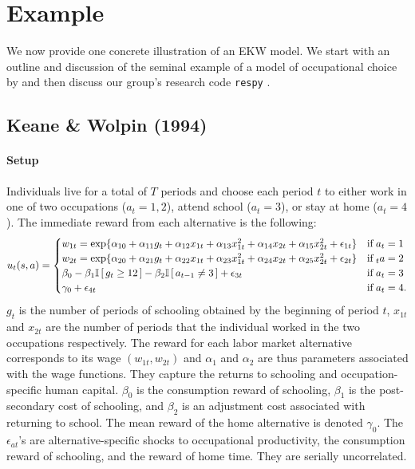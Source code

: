 \section{Example}\label{Example}
We now provide one concrete illustration of an EKW model. We start with an outline and discussion of the seminal example of a model of occupational choice by \citet{Keane.1994} and then discuss our group's research code \verb+respy+ \citep{respy-1.0}.
\subsection{Keane \& Wolpin (1994)}
\paragraph{Setup} Individuals live for a total of $T$ periods and choose each period $t$ to either work in one of two occupations ($a_t = 1, 2$), attend school ($a_t = 3$), or stay at home ($a_t = 4$). The immediate reward from each alternative is the following:
%
\begin{align*}
u_t(s, a) = \begin{cases} w_{1t} =
\exp\{\alpha_{10} + \alpha_{11}g_t + \alpha_{12}x_{1t} + \alpha_{13}x^2_{1t} + \alpha_{14}x_{2t} + \alpha_{15}x^2_{2t} + \epsilon_{1t}\} & \text{if}\; a_t = 1 \\
w_{2t} = \exp\{\alpha_{20} + \alpha_{21}g_t + \alpha_{22}x_{1t} + \alpha_{23}x^2_{1t} + \alpha_{24}x_{2t} + \alpha_{25}x^2_{2t} + \epsilon_{2t}\}& \text{if}\;_t a = 2 \\
\beta_0 - \beta_1 \mathbb{I}\,[\,g_t \geq 12\,] - \beta_2\mathbb{I}\,[\,a_{t - 1} \neq 3\,] + \epsilon_{3t}& \text{if}\; a_t = 3 \\
\gamma_0 + \epsilon_{4t}& \text{if}\; a_t = 4. \\
\end{cases}
\end{align*}
%
$g_t$ is the number of periods of schooling obtained by the beginning of period $t$, $x_{1t}$ and $x_{2t}$ are the number of periods that the individual worked in the two occupations respectively. The reward for each labor market alternative corresponds to its wage $(w_{1t}, w_{2t})$ and $\alpha_{1}$ and $\alpha_{2}$ are thus parameters associated with the wage functions. They capture the returns to schooling and occupation-specific human capital. $\beta_0$ is the consumption reward of schooling, $\beta_1$ is the post-secondary cost of schooling, and $\beta_2$ is an adjustment cost associated with returning to school. The mean reward of the home alternative is denoted $\gamma_0$. The $\epsilon_{at}$'s are alternative-specific shocks to occupational productivity, the consumption reward of schooling, and the reward of home time. They are serially uncorrelated.\\

